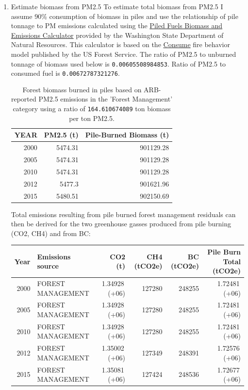 \documentclass[a4paper]{article}
\begin{document}
\begin{enumerate}
\item Estimate biomass from PM2.5
\label{sec-3-4-0-1}
To estimate total biomass from PM2.5 I assume 90\% consumption of biomass in piles and use the relationship of pile tonnage to PM emissions calculated using the \href{http://depts.washington.edu/nwfire/piles/}{Piled Fuels Biomass and Emissions Calculator} provided by the Washington State Department of Natural Resources. This calculator is based on the \href{http://www.fs.fed.us/pnw/fera/research/smoke/consume/index.shtml}{Consume} fire behavior model published by the US Forest Service. The ratio of PM2.5 to unburned tonnage of biomass used below is \texttt{0.00605508984853}. Ratio of PM2.5 to consumed fuel is \texttt{0.00672787321276}.


\begin{table}[htb]
\caption{Forest biomass burned in piles based on ARB-reported PM2.5 emissions in the 'Forest Management' category using a ratio of \texttt{164.610674089} ton biomass per ton PM2.5.}
\centering
\begin{tabular}{rrr}
YEAR & PM2.5 (t) & Pile-Burned Biomass (t)\\
\hline
2000 & 5474.31 & 901129.28\\
2005 & 5474.31 & 901129.28\\
2010 & 5474.31 & 901129.28\\
2012 & 5477.3 & 901621.96\\
2015 & 5480.51 & 902150.69\\
\end{tabular}
\end{table}

Total emissions resulting from pile burned forest management residuals
can then be derived for the two greenhouse gasses produced from pile
burning (CO2, CH4) and from BC:

\begin{center}
\begin{tabular}{rlrrrr}
Year & Emissions source & CO2 (t) & CH4 (tCO2e) & BC (tCO2e) & Pile Burn Total (tCO2e)\\
\hline
2000 & FOREST MANAGEMENT & 1.34928\,(+06) & 127280 & 248255 & 1.72481\,(+06)\\
2005 & FOREST MANAGEMENT & 1.34928\,(+06) & 127280 & 248255 & 1.72481\,(+06)\\
2010 & FOREST MANAGEMENT & 1.34928\,(+06) & 127280 & 248255 & 1.72481\,(+06)\\
2012 & FOREST MANAGEMENT & 1.35002\,(+06) & 127349 & 248391 & 1.72576\,(+06)\\
2015 & FOREST MANAGEMENT & 1.35081\,(+06) & 127424 & 248536 & 1.72677\,(+06)\\
\end{tabular}
\end{center}



\end{enumerate}
\end{document}
